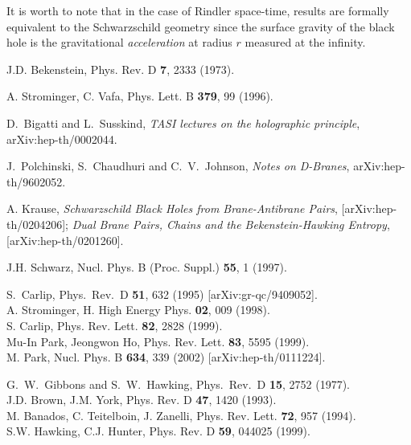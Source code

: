 \noindent It is worth to note that in the case of Rindler
space-time, results are formally equivalent to the Schwarzschild
geometry since the surface gravity of the black hole is the
gravitational {\it acceleration} at radius $r$ measured at the
infinity.


 \begin{thebibliography}{99}
 J.D. Bekenstein, Phys. Rev. D {\bf 7}, 2333
                    (1973).

 A. Strominger, C. Vafa, Phys. Lett. B {\bf 379}, 99
                (1996).

D.~Bigatti and L.~Susskind, {\it TASI lectures on the holographic
principle}, arXiv:hep-th/0002044.

J.~Polchinski, S.~Chaudhuri and C.~V.~Johnson, {\it Notes on
D-Branes}, arXiv:hep-th/9602052.

 A. Krause, {\it Schwarzschild Black Holes from Brane-Antibrane
                Pairs}, [arXiv:hep-th/0204206]; {\it Dual Brane Pairs, Chains and
                the Bekenstein-Hawking Entropy},
                [arXiv:hep-th/0201260].

 J.H. Schwarz, Nucl. Phys. B (Proc. Suppl.) {\bf 55}, 1 (1997).

S.~Carlip,
Phys.\ Rev.\ D {\bf 51}, 632 (1995) [arXiv:gr-qc/9409052].
 \\
                 A. Strominger, H. High Energy Phys. {\bf 02}, 009 (1998). \\
                 S. Carlip, Phys. Rev. Lett. {\bf 82}, 2828 (1999). \\
                  Mu-In Park, Jeongwon Ho, Phys. Rev. Lett. {\bf 83}, 5595
                  (1999). \\
                 M. Park, Nucl. Phys. B {\bf 634}, 339 (2002)
                 [arXiv:hep-th/0111224].

G.~W.~Gibbons and S.~W.~Hawking,
Phys.\ Rev.\ D {\bf 15}, 2752 (1977).
             \\
                  J.D. Brown, J.M. York, Phys. Rev. D {\bf 47}, 1420 (1993). \\
                  M. Banados, C. Teitelboin, J. Zanelli, Phys. Rev. Lett. {\bf 72}, 957 (1994).\\
                  S.W. Hawking, C.J. Hunter, Phys. Rev. D {\bf 59}, 044025 (1999).


\end{thebibliography}
